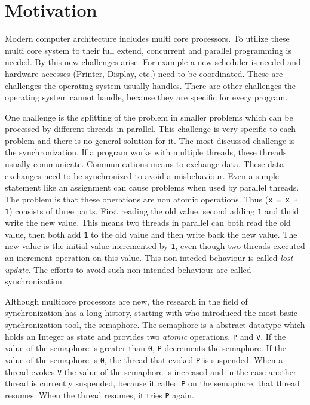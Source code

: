 
\chapter{Motivation} %

\label{Chapter0} %


\newcommand{\keyword}[1]{\textit{#1}}
\newcommand{\tabhead}[1]{\textbf{#1}}
\newcommand{\code}[1]{\texttt{#1}}
\newcommand{\file}[1]{\texttt{\bfseries#1}}
\newcommand{\option}[1]{\texttt{\itshape#1}}

Modern computer architecture includes multi core processors. To utilize these multi core system to their full extend, concurrent and parallel programming is needed.
By this new challenges arise. For example a new scheduler is needed and hardware accesses (Printer, Display, etc.) need to be 
coordinated. These are challenges the operating system usually handles. There are other challenges the operating system cannot handle, because they are specific 
for every program.

One challenge is the splitting of the problem in smaller problems which can be processed by different threads in parallel. This challenge is very specific
to each problem and there is no general solution for it. 
The most discussed challenge is the synchronization. If a program works with multiple threads, these threads usually communicate. Communications means to 
exchange data. These data exchanges need to be synchronized to avoid a misbehaviour. Even a simple statement like an assignment can cause problems when used by parallel threads. The problem is that these operations are
non atomic operations. Thus (\code{x = x + 1}) consists of three parts. First reading the old value, second adding \code{1} and thrid write the new value.
This means two threads in parallel can both read the old value, then both add \code{1} to the old value and then write back the new value. 
The new value is the initial value incremented by \code{1}, even though two threads executed an increment operation on this value. 
This non inteded behaviour is called \keyword{lost update}. The efforts to avoid such non intended behaviour are called synchronization.

Although multicore processors are new, the research in the field of synchronization has a long history, starting with \parencite{semaphore} who
introduced the most basic synchronization tool, the semaphore. The semaphore is a abstract datatype which holds an Integer as state and provides two 
\keyword{atomic} operations, \code{P} and \code{V}. If the value of the semaphore is greater than \code{0}, \code{P} decrements the semaphore. If the value of 
the semaphore is \code{0}, the thread that evoked \code{P} is suspended. When a thread evokes \code{V} the value of the semaphore is increased and
in the case another thread is currently suspended, because it called \code{P} on the semaphore, that thread resumes. When the thread 
resumes, it tries \code{P} again. 

